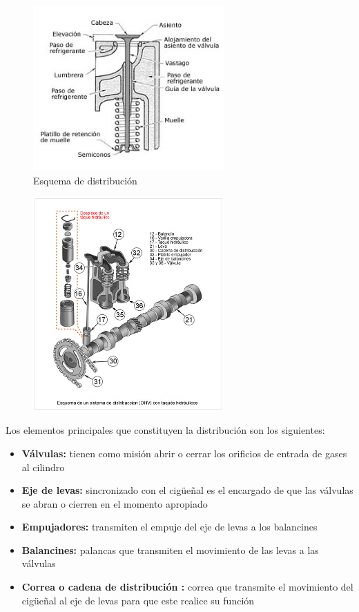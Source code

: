 \documentclass[a4paper,12pt,oneside]{article}
\begin{document}
\begin{center}
\begin{figure}[htbp]
\centering
\includegraphics[width=0.65\textwidth]{./img_0009/valvulabloque.jpg}
\caption{Esquema de distribución}
\end{figure}

\begin{figure}[htbp]
\centering
\includegraphics[width=0.65\textwidth]{./img_0009/esquema_distribucion.jpg}
\caption{}
\end{figure}
\end{center}

Los elementos principales que constituyen la distribución son los siguientes:
\begin{itemize}
\item \textbf{Válvulas:} tienen como misión abrir o cerrar los orificios de entrada de
gases al cilindro
\item \textbf{Eje de levas:} sincronizado con el cigüeñal es el encargado de que las
válvulas se abran o cierren en el momento apropiado
\item \textbf{Empujadores:} transmiten el empuje del eje de levas a los balancines
\item \textbf{Balancines:} palancas que transmiten el movimiento de las levas a las válvulas
\item \textbf{Correa o cadena de distribución :} correa que transmite el movimiento del
cigüeñal al eje de levas para que este realice su función
\end{itemize}
\end{document}
